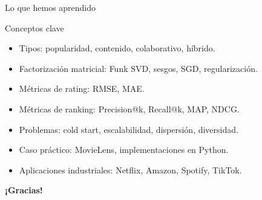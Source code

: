\documentclass[aspectratio=169, 10pt, xcolor=table]{beamer}
\begin{document}
\begin{frame}{Lo que hemos aprendido}
    \begin{exampleblock}{Conceptos clave}
        \begin{itemize}
            \item Tipos: popularidad, contenido, colaborativo, híbrido.
            \item Factorización matricial: Funk SVD, sesgos, SGD, regularización.
            \item Métricas de rating: RMSE, MAE.
            \item Métricas de ranking: Precision@k, Recall@k, MAP, NDCG.
            \item Problemas: cold start, escalabilidad, dispersión, diversidad.
            \item Caso práctico: MovieLens, implementaciones en Python.
            \item Aplicaciones industriales: Netflix, Amazon, Spotify, TikTok.
        \end{itemize}
    \end{exampleblock}
\end{frame}

\begin{frame}
    \centering
    \Huge \textbf{¡Gracias!}

\end{frame}
\end{document}
